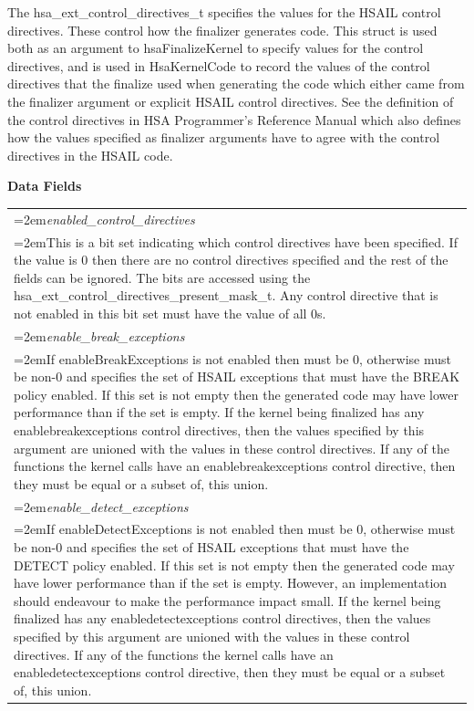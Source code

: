 \documentclass[final]{book}
\newcommand{\reffld}[1]{\textit{#1}}
\begin{document}
The hsa_\-ext_\-control_\-directives_\-t specifies the values for the HSAIL control directives. These control how the finalizer generates code. This struct is used both as an argument to hsaFinalizeKernel to specify values for the control directives, and is used in HsaKernelCode to record the values of the control directives that the finalize used when generating the code which either came from the finalizer argument or explicit HSAIL control directives. See the definition of the control directives in HSA Programmer's Reference Manual which also defines how the values specified as finalizer arguments have to agree with the control directives in the HSAIL code.

\noindent\textbf{Data Fields}\\[-6mm]
\begin{longtable}{@{}>{\hangindent=2em}p{\textwidth}}
\reffld{enabled_\-control_\-directives}\\\hspace{2em}This is a bit set indicating which control directives have been specified. If the value is 0 then there are no control directives specified and the rest of the fields can be ignored. The bits are accessed using the hsa_\-ext_\-control_\-directives_\-present_\-mask_\-t. Any control directive that is not enabled in this bit set must have the value of all 0s.\\[2mm]
\reffld{enable_\-break_\-exceptions}\\\hspace{2em}If enableBreakExceptions is not enabled then must be 0, otherwise must be non-0 and specifies the set of HSAIL exceptions that must have the BREAK policy enabled. If this set is not empty then the generated code may have lower performance than if the set is empty. If the kernel being finalized has any enablebreakexceptions control directives, then the values specified by this argument are unioned with the values in these control directives. If any of the functions the kernel calls have an enablebreakexceptions control directive, then they must be equal or a subset of, this union.\\[2mm]
\reffld{enable_\-detect_\-exceptions}\\\hspace{2em}If enableDetectExceptions is not enabled then must be 0, otherwise must be non-0 and specifies the set of HSAIL exceptions that must have the DETECT policy enabled. If this set is not empty then the generated code may have lower performance than if the set is empty. However, an implementation should endeavour to make the performance impact small. If the kernel being finalized has any enabledetectexceptions control directives, then the values specified by this argument are unioned with the values in these control directives. If any of the functions the kernel calls have an enabledetectexceptions control directive, then they must be equal or a subset of, this union.\\[2mm]

\end{longtable}
\end{document}
